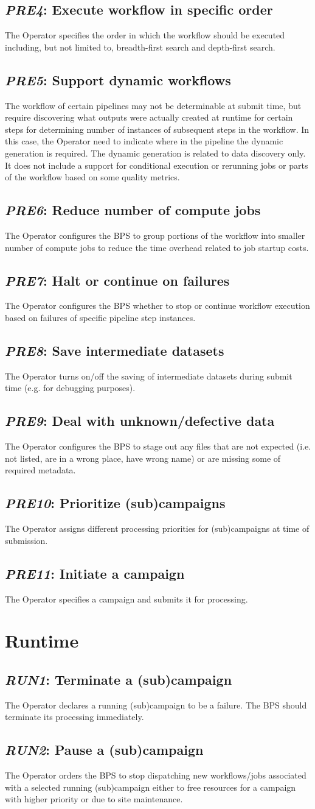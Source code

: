 \documentclass[DM,toc]{lsstdoc}
\newcommand{\usecase}[2]{\subsection{\emph{#1}: #2}\label{use:#1}}
\begin{document}
\usecase{PRE4}{Execute workflow in specific order}
The Operator specifies the order in which the workflow should be executed
including, but not limited to, breadth-first search and depth-first search.

\usecase{PRE5}{Support dynamic workflows}
The workflow of certain pipelines may not be determinable at submit
time, but require discovering what outputs were actually created at
runtime for certain steps for determining number of instances of
subsequent steps in the workflow.  In this case, the Operator need
to indicate where in the pipeline the dynamic generation is required.
The dynamic generation is related to data discovery only. It does not
include a support for conditional execution or rerunning jobs or parts
of the workflow based on some quality metrics.

\usecase{PRE6}{Reduce number of compute jobs}
The Operator configures the BPS to group portions of the workflow into smaller
number of compute jobs to reduce the time overhead related to job startup
costs.

\usecase{PRE7}{Halt or continue on failures}
The Operator configures the BPS whether to stop or continue workflow execution
based on failures of specific pipeline step instances.

\usecase{PRE8}{Save intermediate datasets}
The Operator turns on/off the saving of intermediate datasets during submit
time (e.g. for debugging purposes).

\usecase{PRE9}{Deal with unknown/defective data}
The Operator configures the BPS to stage out any files that are not expected
(i.e. not listed, are in a wrong place, have wrong name) or are missing some of
required metadata.

\usecase{PRE10}{Prioritize (sub)campaigns}
The Operator assigns different processing priorities for (sub)campaigns at
time of submission. 

\usecase{PRE11}{Initiate a campaign}
The Operator specifies a campaign and submits it for processing.


\section{Runtime}

\usecase{RUN1}{Terminate a (sub)campaign}
The Operator declares a running (sub)campaign to be a failure. The BPS should
terminate its processing immediately.

\usecase{RUN2}{Pause a (sub)campaign}
The Operator orders the BPS to stop dispatching new workflows/jobs
associated with a selected running (sub)campaign either to free
resources for a campaign with higher priority or due to site maintenance.
\end{document}
